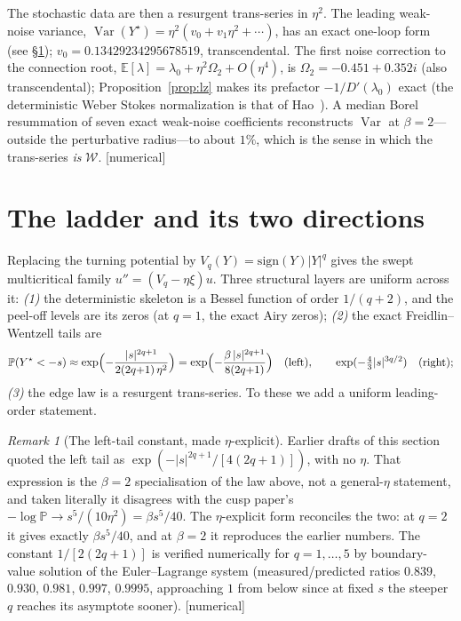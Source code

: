 \documentclass[11pt,reqno]{amsart}
\theoremstyle{plain}
\theoremstyle{definition}
\theoremstyle{remark}
\newtheorem{remark}[theorem]{Remark}
\newcommand{\E}{\mathbb{E}}
\newcommand{\Prob}{\mathbb{P}}
\newcommand{\Var}{\operatorname{Var}}
\newcommand{\W}{\mathcal{W}}
\newcommand{\Ynode}{Y^\star}
\newcommand{\tagN}{{\footnotesize\textsf{[numerical]}}}
\begin{document}
The stochastic data are then a resurgent trans-series in $\eta^2$. The leading weak-noise variance,
$\Var(\Ynode)=\eta^2(v_0+v_1\eta^2+\cdots)$, has an exact one-loop form (see \S\ref{sec:ladder});
$v_0=0.13429234295678519$, transcendental. The first noise correction to the connection root,
$\E[\lambda]=\lambda_0+\eta^2\Omega_2+O(\eta^4)$, is $\Omega_2=-0.451+0.352i$ (also transcendental);
Proposition~\ref{prop:lz} makes its prefactor $-1/D'(\lambda_0)$ exact (the deterministic Weber
Stokes normalization is that of Hao~\cite{Hao}). A median Borel resummation of seven exact weak-noise
coefficients reconstructs $\Var$ at $\beta{=}2$---outside the perturbative radius---to about $1\%$,
which is the sense in which the trans-series \emph{is} $\W$. \tagN

\section{The ladder and its two directions}\label{sec:ladder}

Replacing the turning potential by $V_q(Y)=\mathrm{sign}(Y)|Y|^q$ gives the swept multicritical
family $u''=(V_q-\eta\xi)u$. Three structural layers are uniform across it:
\emph{(1)} the deterministic skeleton is a Bessel function of order $1/(q{+}2)$, and the peel-off
levels are its zeros (at $q{=}1$, the exact Airy zeros); \emph{(2)} the exact Freidlin--Wentzell
tails are
\[
\Prob(Y^\star<-s)\approx\exp\Bigl(-\frac{|s|^{2q+1}}{2(2q{+}1)\,\eta^2}\Bigr)
=\exp\Bigl(-\frac{\beta\,|s|^{2q+1}}{8(2q{+}1)}\Bigr)\quad\text{(left)},
\qquad \exp(-\tfrac43|s|^{3q/2})\quad\text{(right)};
\]
\emph{(3)} the edge law is a resurgent trans-series. To these we add a uniform leading-order
statement.

\begin{remark}[The left-tail constant, made $\eta$-explicit]\label{rem:fwconstant}
Earlier drafts of this section quoted the left tail as $\exp(-|s|^{2q+1}/[4(2q{+}1)])$, with no
$\eta$. That expression is the $\beta{=}2$ specialisation of the law above, not a general-$\eta$
statement, and taken literally it disagrees with the cusp paper's
$-\log\Prob\to s^5/(10\eta^2)=\beta s^5/40$. The $\eta$-explicit form reconciles the two: at $q=2$
it gives exactly $\beta s^5/40$, and at $\beta=2$ it reproduces the earlier numbers. The constant
$1/[2(2q{+}1)]$ is verified numerically for $q=1,\dots,5$ by boundary-value solution of the
Euler--Lagrange system (measured/predicted ratios $0.839$, $0.930$, $0.981$, $0.997$, $0.9995$,
approaching $1$ from below since at fixed $s$ the steeper $q$ reaches its asymptote sooner).
\tagN
\end{remark}
\end{document}
